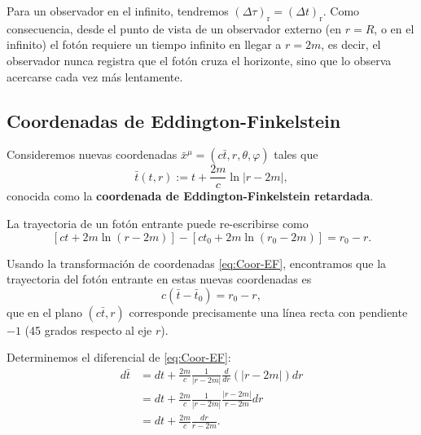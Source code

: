 \documentclass[letterpaper,11pt]{article}
\begin{document}
Para un observador en el infinito, tendremos $(\Delta \tau)_{\text{r}}  = (\Delta t)_{\text{r}}$. Como consecuencia, desde el punto de vista de un observador externo (en $r = R$, o en el infinito) el fotón requiere un tiempo infinito en llegar a $r = 2m$, es decir, el observador nunca registra que 
el fotón cruza el horizonte, sino que lo observa acercarse cada vez más lentamente.

\subsection*{Coordenadas de Eddington-Finkelstein}

Consideremos nuevas coordenadas $\bar{x}^{\mu} = (c\bar{t},r,\theta,\varphi)$ tales que 
\begin{equation}
\bar{t}(t,r) := t + \frac{2m}{c} \ln|r - 2m|, \label{eq:Coor-EF}
\end{equation}
conocida como la \textbf{coordenada de Eddington-Finkelstein retardada}.

La trayectoria de un fotón entrante puede re-escribirse como
\begin{equation}
\left[ ct + 2m \ln\left(r-2m\right)\right] - \left[ct_0 + 2m \ln\left(r_0-2m\right) \right] = r_0 - r. 
\end{equation}

Usando la transformación de coordenadas \eqref{eq:Coor-EF}, encontramos que la trayectoria del fotón entrante en estas nuevas coordenadas es
\begin{equation}
c(\bar{t} - \bar{t}_0) = r_0 - r, \label{eq:EF-in}
\end{equation}
que en el plano $(c\bar{t},r)$ corresponde precisamente una línea recta con pendiente $-1$ (45 grados respecto al eje $r$).

Determinemos el diferencial de \eqref{eq:Coor-EF}:
\begin{align}
d\bar{t} &= dt + \frac{2m}{c} \frac{1}{|r - 2m|} \frac{d}{dr}(|r - 2m|) dr \nonumber \\
&= dt + \frac{2m}{c} \frac{1}{|r - 2m|} \frac{|r - 2m|}{r-2m} dr \nonumber \\
&= dt + \frac{2m}{c} \frac{dr}{r - 2m}. 
\end{align}
\end{document}
